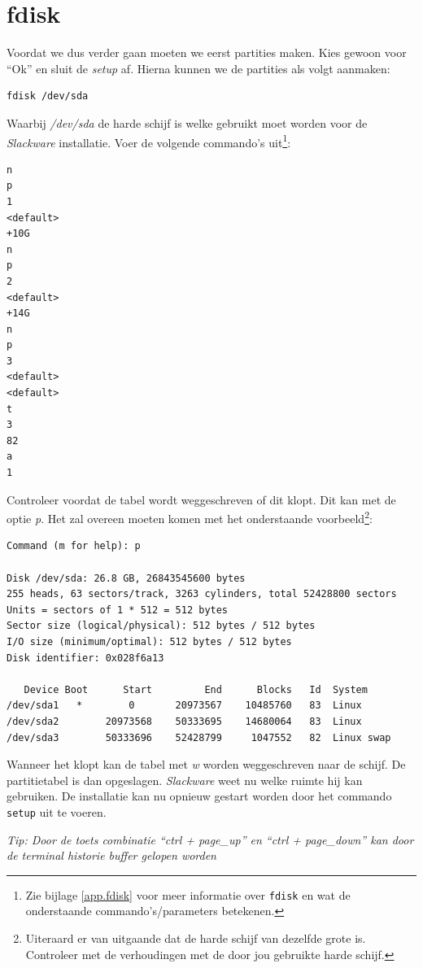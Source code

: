 \section{fdisk}
Voordat we dus verder gaan moeten we eerst partities maken. Kies gewoon voor ``Ok'' en sluit de \emph{setup} af. Hierna kunnen we de partities als volgt aanmaken:
\begin{lstlisting}
fdisk /dev/sda
\end{lstlisting}
Waarbij \emph{/dev/sda} de harde schijf is welke gebruikt moet worden voor de \emph{Slackware} installatie. Voer de volgende commando's uit\footnote{Zie bijlage \ref{app.fdisk} voor meer informatie over \texttt{fdisk} en wat de onderstaande commando's/parameters betekenen.}:
\begin{lstlisting}
n
p
1
<default>
+10G
n
p
2
<default>
+14G
n
p
3
<default>
<default>
t
3
82
a
1
\end{lstlisting}
Controleer voordat de tabel wordt weggeschreven of dit klopt. Dit kan met de optie \emph{p}. Het zal overeen moeten komen met het onderstaande voorbeeld\footnote{Uiteraard er van uitgaande dat de harde schijf van dezelfde grote is. Controleer met de verhoudingen met de door jou gebruikte harde schijf.}:
\begin{lstlisting}
Command (m for help): p

Disk /dev/sda: 26.8 GB, 26843545600 bytes
255 heads, 63 sectors/track, 3263 cylinders, total 52428800 sectors
Units = sectors of 1 * 512 = 512 bytes
Sector size (logical/physical): 512 bytes / 512 bytes
I/O size (minimum/optimal): 512 bytes / 512 bytes
Disk identifier: 0x028f6a13

   Device Boot      Start         End      Blocks   Id  System
/dev/sda1   *        0       20973567    10485760   83  Linux
/dev/sda2        20973568    50333695    14680064   83  Linux
/dev/sda3        50333696    52428799     1047552   82  Linux swap
\end{lstlisting}
Wanneer het klopt kan de tabel met \emph{w} worden weggeschreven naar de schijf. De partitietabel is dan opgeslagen. \emph{Slackware} weet nu welke ruimte hij kan gebruiken. De installatie kan nu opnieuw gestart worden door het commando \texttt{setup} uit te voeren. 

\emph{Tip: Door de toets combinatie ``ctrl + page\_up'' en ``ctrl + page\_down'' kan door de terminal historie buffer gelopen worden}

